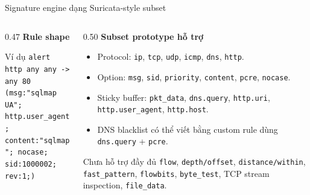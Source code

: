 \documentclass[t, aspectratio=169]{beamer}
\begin{document}
\begin{frame}{Signature engine dạng Suricata-style subset}
    \small
    \begin{columns}[T,onlytextwidth]
        \begin{column}{0.47\textwidth}
            \textbf{Rule shape}
            \begin{block}{Ví dụ}
                \footnotesize
                \texttt{alert http any any -> any 80}\\
                \texttt{(msg:"sqlmap UA";}\\
                \texttt{http.user\_agent;}\\
                \texttt{content:"sqlmap"; nocase;}\\
                \texttt{sid:1000002; rev:1;)}
            \end{block}
        \end{column}
        \begin{column}{0.50\textwidth}
            \textbf{Subset prototype hỗ trợ}
            \begin{itemize}
                \item Protocol: \texttt{ip}, \texttt{tcp}, \texttt{udp}, \texttt{icmp}, \texttt{dns}, \texttt{http}.
                \item Option: \texttt{msg}, \texttt{sid}, \texttt{priority}, \texttt{content}, \texttt{pcre}, \texttt{nocase}.
                \item Sticky buffer: \texttt{pkt\_data}, \texttt{dns.query}, \texttt{http.uri}, \texttt{http.user\_agent}, \texttt{http.host}.
                \item DNS blacklist có thể viết bằng custom rule dùng \texttt{dns.query} + \texttt{pcre}.
            \end{itemize}
            \begin{alertblock}{Chưa hỗ trợ đầy đủ}
                \footnotesize \texttt{flow}, \texttt{depth/offset}, \texttt{distance/within}, \texttt{fast\_pattern}, \texttt{flowbits}, \texttt{byte\_test}, TCP stream inspection, \texttt{file\_data}.
            \end{alertblock}
        \end{column}
    \end{columns}
\end{frame}
\end{document}
